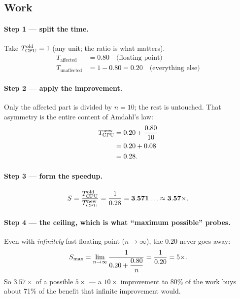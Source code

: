 \subsection*{Work}

\paragraph{Step 1 --- split the time.}
Take $T_{\mathrm{CPU}}^{\text{old}} = 1$ (any unit; the ratio is what matters).
\begin{align}
  T_{\text{affected}}   &= 0.80 \quad\text{(floating point)} \\
  T_{\text{unaffected}} &= 1 - 0.80 = 0.20 \quad\text{(everything else)}
\end{align}

\paragraph{Step 2 --- apply the improvement.}
Only the affected part is divided by $n = 10$; the rest is untouched. That
asymmetry is the entire content of Amdahl's law:
\begin{align}
  T_{\mathrm{CPU}}^{\text{new}} &= 0.20 + \frac{0.80}{10} \\
                        &= 0.20 + 0.08 \\
                        &= 0.28.
\end{align}

\paragraph{Step 3 --- form the speedup.}
\begin{equation}
  S = \frac{T_{\mathrm{CPU}}^{\text{old}}}{T_{\mathrm{CPU}}^{\text{new}}}
           = \frac{1}{0.28}
           = \mathbf{3.571\ldots \approx 3.57{\times}}.
\end{equation}

\paragraph{Step 4 --- the ceiling, which is what ``maximum possible'' probes.}
Even with \emph{infinitely} fast floating point ($n \to \infty$), the $0.20$
never goes away:
\begin{equation}
  S_{\max} = \lim_{n\to\infty} \frac{1}{0.20 + \dfrac{0.80}{n}}
                  = \frac{1}{0.20} = 5{\times}.
\end{equation}
So $3.57\times$ of a possible $5\times$ — a $10\times$ improvement to 80\% of the
work buys about 71\% of the benefit that infinite improvement would.


